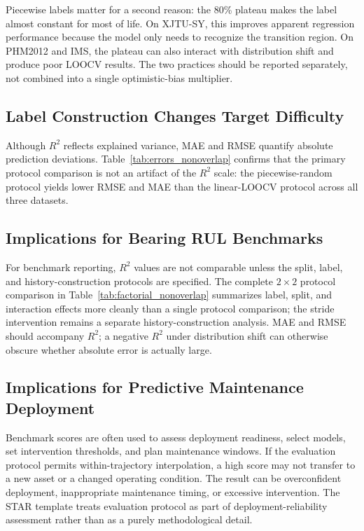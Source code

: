 \documentclass[pdflatex,sn-basic,NameDate]{sn-jnl}
\begin{document}
Piecewise labels matter for a second reason: the 80\% plateau makes the label almost constant for most of life. On XJTU-SY, this improves apparent regression performance because the model only needs to recognize the transition region. On PHM2012 and IMS, the plateau can also interact with distribution shift and produce poor LOOCV results. The two practices should be reported separately, not combined into a single optimistic-bias multiplier.
\subsection{Label Construction Changes Target Difficulty}

Although $R^2$ reflects explained variance, MAE and RMSE quantify absolute prediction deviations. Table~\ref{tab:errors_nonoverlap} confirms that the primary protocol comparison is not an artifact of the $R^2$ scale: the piecewise-random protocol yields lower RMSE and MAE than the linear-LOOCV protocol across all three datasets.

\subsection{Implications for Bearing RUL Benchmarks}
For benchmark reporting, $R^2$ values are not comparable unless the split, label, and history-construction protocols are specified. The complete $2 \times 2$ protocol comparison in Table~\ref{tab:factorial_nonoverlap} summarizes label, split, and interaction effects more cleanly than a single protocol comparison; the stride intervention remains a separate history-construction analysis. MAE and RMSE should accompany $R^2$; a negative $R^2$ under distribution shift can otherwise obscure whether absolute error is actually large.

\subsection{Implications for Predictive Maintenance Deployment}
Benchmark scores are often used to assess deployment readiness, select models, set intervention thresholds, and plan maintenance windows. If the evaluation protocol permits within-trajectory interpolation, a high score may not transfer to a new asset or a changed operating condition. The result can be overconfident deployment, inappropriate maintenance timing, or excessive intervention. The STAR template treats evaluation protocol as part of deployment-reliability assessment rather than as a purely methodological detail.
\end{document}
